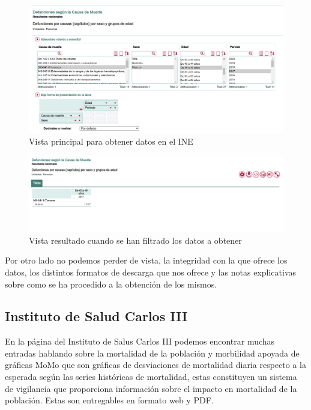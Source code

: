 \begin{figure}[]
	\centering
	\includegraphics[scale=0.5]{doc/logos/imgs/ine1.png}
	\caption{ \cite{INE}  Vista principal para obtener datos en el INE }
    \label{fig:worst_f_value}
\end{figure}

\begin{figure}[]
	\centering
	\includegraphics[scale=0.5]{doc/logos/imgs/ine2.png}
	\caption{ \cite{INE} Vista resultado cuando se han filtrado los datos a obtener }
    \label{fig:worst_f_value}
\end{figure}
Por otro lado no podemos perder de vista, la integridad con la que ofrece los datos, los distintos formatos
de descarga que nos ofrece y las notas explicativas sobre como se ha procedido a la obtención de los mismos.

\subsection{Instituto de Salud Carlos III}
En la página del Instituto de Salus Carlos III \cite{isciii} podemos encontrar muchas entradas hablando sobre
la mortalidad de la población y morbilidad apoyada de \cite{momo} gráficas MoMo que son gráficas de desviaciones de mortalidad
diaria respecto a la esperada según las series históricas de mortalidad, estas constituyen un sistema de vigilancia
que proporciona información sobre el impacto en mortalidad de la población. Estas son entregables en formato web y PDF.

